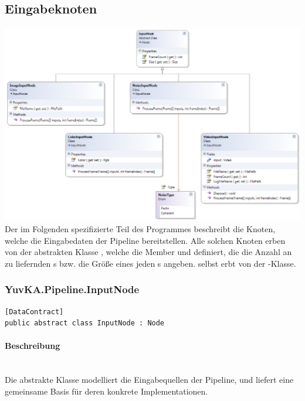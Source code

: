 \subsection{Eingabeknoten}

\includegraphics[width=\textwidth]{YuvKA.Pipeline/inputnodes.png}
Der im Folgenden spezifizierte Teil des Programmes beschreibt die Knoten, welche die Eingabedaten der Pipeline bereitstellen. Alle solchen Knoten erben von der abstrakten Klasse , welche die Member  und  definiert, die die Anzahl an zu liefernden s bzw. die Größe eines jeden s angeben.
 selbst erbt von der -Klasse.


\subsubsection{YuvKA.Pipeline.InputNode}

\begin{verbatim}
[DataContract]
public abstract class InputNode : Node
\end{verbatim}

\paragraph{Beschreibung}~\\
Die abstrakte Klasse  modelliert die Eingabequellen der Pipeline, und liefert eine gemeinsame Basis für deren konkrete Implementationen.

